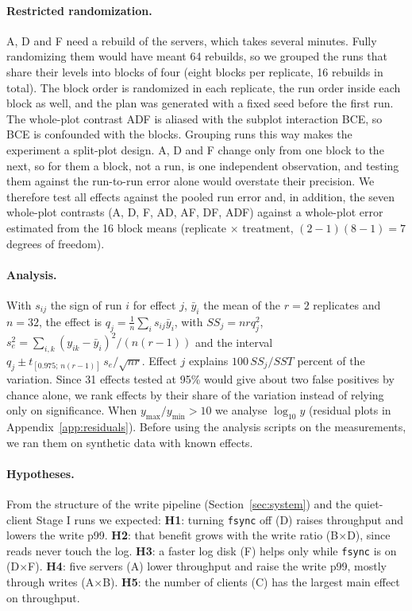 \documentclass{llncs}
\begin{document}
\paragraph{Restricted randomization.} A, D and F need a rebuild of the servers, which takes several minutes. Fully randomizing them would have meant 64 rebuilds, so we grouped the runs that share their levels into blocks of four (eight blocks per replicate, 16 rebuilds in total). The block order is randomized in each replicate, the run order inside each block as well, and the plan was generated with a fixed seed before the first run. The whole-plot contrast ADF is aliased with the subplot interaction BCE, so BCE is confounded with the blocks. Grouping runs this way makes the experiment a split-plot design. A, D and F change only from one block to the next, so for them a block, not a run, is one independent observation, and testing them against the run-to-run error alone would overstate their precision. We therefore test all effects against the pooled run error and, in addition, the seven whole-plot contrasts (A, D, F, AD, AF, DF, ADF) against a whole-plot error estimated from the 16 block means (replicate $\times$ treatment, $(2-1)(8-1)=7$ degrees of freedom).

\paragraph{Analysis.} With $s_{ij}$ the sign of run $i$ for effect $j$, $\bar y_i$ the mean of the $r=2$ replicates and $n=32$, the effect is $q_j=\frac1n\sum_{i} s_{ij}\bar y_i$, with $SS_j=nrq_j^2$, $s_e^2=\sum_{i,k}(y_{ik}-\bar y_i)^2/(n(r-1))$ and the interval $q_j \pm t_{[0.975;\,n(r-1)]}\,s_e/\sqrt{n r}$. Effect $j$ explains $100\,SS_j/SST$ percent of the variation. Since 31 effects tested at 95\% would give about two false positives by chance alone, we rank effects by their share of the variation instead of relying only on significance. When $y_{\max}/y_{\min}>10$ we analyse $\log_{10}y$ (residual plots in Appendix~\ref{app:residuals}). Before using the analysis scripts on the measurements, we ran them on synthetic data with known effects.

\paragraph{Hypotheses.} From the structure of the write pipeline (Section~\ref{sec:system}) and the quiet-client Stage I runs we expected:
\textbf{H1}: turning \texttt{fsync} off (D) raises throughput and lowers the write p99.
\textbf{H2}: that benefit grows with the write ratio (B$\times$D), since reads never touch the log.
\textbf{H3}: a faster log disk (F) helps only while \texttt{fsync} is on (D$\times$F).
\textbf{H4}: five servers (A) lower throughput and raise the write p99, mostly through writes (A$\times$B).
\textbf{H5}: the number of clients (C) has the largest main effect on throughput.
\end{document}

